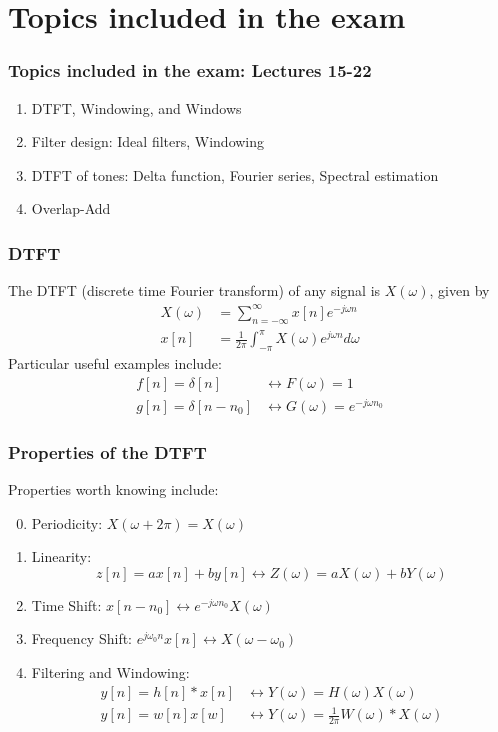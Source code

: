 \documentclass{beamer}
\begin{document}
\section[Topics]{Topics included in the exam}
\setcounter{subsection}{1}

\begin{frame}
  \frametitle{Topics included in the exam: Lectures 15-22}

  \begin{enumerate}
  \item DTFT, Windowing, and Windows
  \item Filter design: Ideal filters, Windowing
  \item DTFT of tones: Delta function, Fourier series, Spectral estimation
  \item Overlap-Add
  \end{enumerate}
\end{frame}

\begin{frame}
  \frametitle{DTFT}

  The DTFT (discrete time Fourier transform) of any signal is
  $X(\omega)$, given by
  \begin{align*}
    X(\omega) &= \sum_{n=-\infty}^\infty x[n]e^{-j\omega n}\\
    x[n] &= \frac{1}{2\pi}\int_{-\pi}^\pi X(\omega)e^{j\omega n}d\omega
  \end{align*}
  Particular useful examples include:
  \begin{align*}
    f[n]=\delta[n] &\leftrightarrow F(\omega)=1\\
    g[n]=\delta[n-n_0] &\leftrightarrow G(\omega)=e^{-j\omega n_0}
  \end{align*}
\end{frame}

\begin{frame}
  \frametitle{Properties of the DTFT}

  Properties worth knowing  include:
  \begin{enumerate}
    \setcounter{enumi}{-1}
  \item Periodicity: $X(\omega+2\pi)=X(\omega)$
  \item Linearity:
    \[z[n]=ax[n]+by[n]\leftrightarrow Z(\omega)=aX(\omega)+bY(\omega)
    \]
  \item Time Shift: $x[n-n_0]\leftrightarrow e^{-j\omega n_0}X(\omega)$
  \item Frequency Shift: $e^{j\omega_0 n}x[n]\leftrightarrow X(\omega-\omega_0)$
  \item Filtering and Windowing:
    \begin{align*}
    y[n]=h[n]\ast x[n]&\leftrightarrow Y(\omega)=H(\omega)X(\omega)\\
    y[n]=w[n]x[w] &\leftrightarrow Y(\omega)=\frac{1}{2\pi}W(\omega)\ast X(\omega)
    \end{align*}
  \end{enumerate}
\end{frame}
\end{document}
